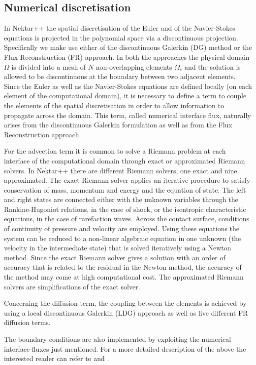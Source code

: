 \subsection{Numerical discretisation}
In Nektar++ the spatial discretisation of the Euler and of the Navier-Stokes
equations is projected in the polynomial space via a discontinuous projection.
Specifically we make use either of the discontinuous Galerkin (DG) method
or the Flux Reconstruction (FR) approach.
In both the approaches the physical domain $\Omega$ is divided into a mesh
of $N$ non-overlapping elements $\Omega_{e}$ and the solution is allowed
to be discontinuous at the boundary between two adjacent elements.
Since the Euler as well as the Navier-Stokes equations are defined locally
(on each element of the computational domain), it is necessary to define
a term to couple the elements of the spatial discretisation in order to allow
information to propagate across the domain. This term, called numerical
interface flux, naturally arises from the discontinuous Galerkin formulation
as well as from the Flux Reconstruction approach.

For the advection term it is common to solve a Riemann problem at each
interface of the computational domain through exact or approximated Riemann
solvers. In Nektar++ there are different Riemann solvers, one exact and nine
approximated. The exact Riemann solver applies an iterative procedure to
satisfy conservation of mass, momentum and energy and the equation of
state. The left and right states are connected either with the unknown variables
through the Rankine-Hugoniot relations, in the case of shock, or the isentropic
characteristic equations, in the case of rarefaction waves. Across the contact
surface, conditions of continuity of pressure and velocity are employed.
Using these equations the system can be reduced to a non-linear algebraic
equation in one unknown (the velocity in the intermediate state) that is solved
iteratively using a Newton method. Since the exact Riemann solver gives
a solution with an order of accuracy that is related to the residual in the
Newton method, the accuracy of the method may come at high computational
cost. The approximated Riemann solvers are simplifications of the exact solver.

Concerning the diffusion term, the coupling between the elements is achieved
by using a local discontinuous Galerkin (LDG) approach as well as five different
FR diffusion terms.

The boundary conditions are also implemented by exploiting the numerical
interface fluxes just mentioned.
For a more detailed description of the above the interested reader can refer
to \cite{DeGMen14} and \cite{MenDeG14}.


